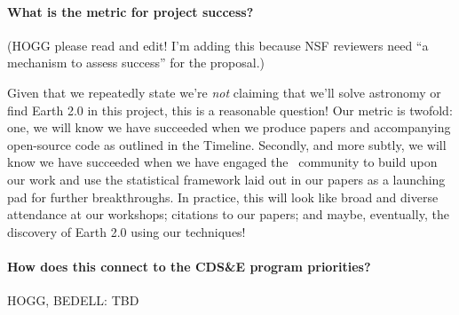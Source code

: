 \documentclass[12pt, letterpaper]{article}
\begin{document}
\paragraph{What is the metric for project success?}
(HOGG please read and edit! I'm adding this because NSF reviewers need ``a mechanism to assess success'' for the proposal.)

Given that we repeatedly state we're \textit{not} claiming that we'll 
solve astronomy or find Earth 2.0 in this project, this is a reasonable 
question! Our metric is twofold: one, we will know we have succeeded when we 
produce papers and accompanying open-source code as outlined in the Timeline. 
Secondly, and more subtly, we will know we have succeeded when we have engaged 
the \EPRV\ community to build upon our work and use the statistical framework 
laid out in our papers as a launching pad for further breakthroughs. 
In practice, this will look like broad and diverse attendance at our workshops; 
citations to our papers; and maybe, eventually, the discovery of Earth 2.0
using our techniques!

\paragraph{How does this connect to the CDS\&E program priorities?}
HOGG, BEDELL: TBD

\clearpage

\raggedright
\end{document}
